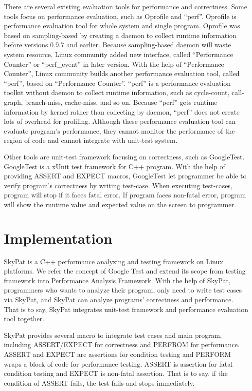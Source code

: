 \documentclass[final]{ols}
\begin{document}
There are several existing evaluation tools for performance and correctness.
Some tools focus on performance evaluation, such as Oprofile\cite{oprofile} and ``perf''. 
Oprofile is performance evaluation tool for whole system and single program.
Oprofile was based on sampling-based by creating a daemon to collect runtime information before versions 0.9.7 and earlier.
Because sampling-based daemon will waste system resource, Linux community added new interface, called ``Performance Counter''\cite{performance-counter-linux} or ``perf\_event'' in later version.
With the help of ``Performance Counter'', Linux community builds another performance evaluation tool, called ``perf'', based on ``Performance Counter''. 
``perf'' is a performance evaluation toolkit without daemon to collect runtime information, such as cycle-count, call-graph, branch-miss, cache-miss, and so on.
Because ``perf'' gets runtime information by kernel rather than collecting by daemon, ``perf'' does not create lots of overhead for profiling.
Although these performance evaluation tool can evaluate program's performance, they cannot monitor the performance of the region of code and cannot integrate with unit-test system.

Other tools are unit-test framework focusing on correctness, such as GoogleTest.
GoogleTest is a xUnit test framework for C++ program.
With the help of providing ASSERT and EXPECT macros, GoogleTest let programmer be able to verify program's correctness by writing test-case.
When executing test-cases, program will stop if it faces fatal error. 
If program faces non-fatal error, program will show the runtime value and expected value on the screen to programmer.

\section{Implementation}

SkyPat is a C++ performance analyzing and testing framework on Linux platforms. 
We refer the concept of Google Test and extend its scope from testing framework into Performance Analysis Framework.
With the help of SkyPat, programmers who wants to analyze their program, only need to write test cases via SkyPat, and SkyPat can analyze programs' correctness and performance. 
That is to say, SkyPat integrates unit-test framework and performance evaluation tool together.

SkyPat provides several macro to integrate test cases and main program, including ASSERT/EXPECT for correctness and PERFROM for performance.
ASSERT and EXPECT are assertions for condition testing and PERFORM wraps a block of code for performance testing. 
ASSERT is assertion for fatal condition testing and EXPECT is non-fatal assertion.
That is to say, if the condition of ASSERT fails, the test fails and stops immediately.
 
\end{document}
